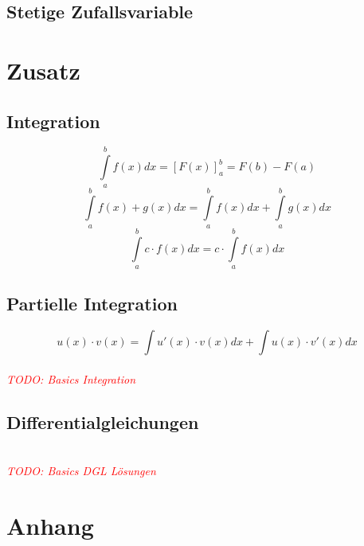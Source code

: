 \documentclass[12pt]{article}
\newcommand\todo[1]{\textit{\textcolor{red}{\\TODO: #1}}}
\begin{document}
\subsection{Stetige Zufallsvariable}

\section{Zusatz}
\subsection{Integration}
\begin{equation}
	\int\limits_{a}^{b}f(x) dx = [F(x)]_a^b = F(b) - F(a)
\end{equation}
\begin{equation}
	\int\limits_{a}^{b}f(x) + g(x) dx = \int\limits_{a}^{b}f(x) dx + \int\limits_{a}^{b}g(x) dx
\end{equation}
\begin{equation}
	\int\limits_{a}^{b}c\cdot f(x) dx = c\cdot \int\limits_{a}^{b}f(x) dx
\end{equation}
\subsection{Partielle Integration}
\begin{equation}
	u(x)\cdot v(x) = \int u'(x) \cdot v(x) dx + \int u(x) \cdot v'(x) dx
\end{equation}
\todo{Basics Integration}
\subsection{Differentialgleichungen}
\todo{Basics DGL Lösungen}
\newpage
{}
\section{Anhang}
\printbibliography[heading=subbibnumbered]
\end{document}
